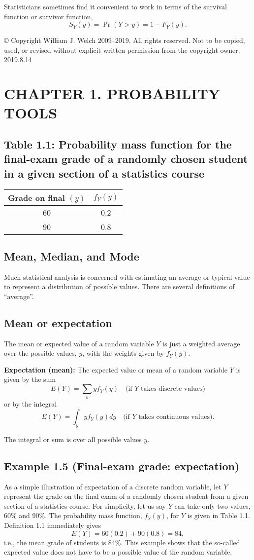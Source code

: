 Statisticians sometimes find it convenient to work in terms of the survival function or survivor function,
\[
S_Y(y) = \Pr(Y > y) = 1 - F_Y(y).
\]

© Copyright William J. Welch 2009--2019. All rights reserved. Not to be copied, used, or revised without explicit written permission from the copyright owner. 2019.8.14

\section{CHAPTER 1. PROBABILITY TOOLS}

\subsection*{Table 1.1: Probability mass function for the final-exam grade of a randomly chosen student in a given section of a statistics course}
\begin{tabular}{|c|c|}
\hline
Grade on final $(y)$ & $f_Y(y)$ \\
\hline
60 & 0.2 \\
90 & 0.8 \\
\hline
\end{tabular}

\subsection{Mean, Median, and Mode}
Much statistical analysis is concerned with estimating an average or typical value to represent a distribution of possible values. There are several definitions of ``average''.

\subsection{Mean or expectation}
The mean or expected value of a random variable $Y$ is just a weighted average over the possible values, $y$, with the weights given by $f_Y(y)$.
\begin{definition}
\textbf{Expectation (mean):} The expected value or mean of a random variable $Y$ is given by the sum
\[
E(Y) = \sum_y y f_Y(y) \quad \text{(if $Y$ takes discrete values)}
\]
or by the integral
\[
E(Y) = \int_y y f_Y(y) dy \quad \text{(if $Y$ takes continuous values)}.
\]
\end{definition}
The integral or sum is over all possible values $y$. 

\subsection{Example 1.5 (Final-exam grade: expectation)}
As a simple illustration of expectation of a discrete random variable, let $Y$ represent the grade on the final exam of a randomly chosen student from a given section of a statistics course. For simplicity, let us say $Y$ can take only two values, 60\% and 90\%. The probability mass function, $f_Y(y)$, for $Y$ is given in Table 1.1. Definition 1.1 immediately gives
\[
E(Y) = 60(0.2) + 90(0.8) = 84,
\]
i.e., the mean grade of students is 84\%. This example shows that the so-called expected value does not have to be a possible value of the random variable.

